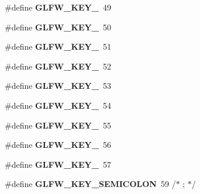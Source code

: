 \begin{DoxyCompactItemize}
\item 
\hypertarget{group__keys_ga05e4cae9ddb8d40cf6d82c8f11f2502f}{}\#define {\bfseries G\+L\+F\+W\+\_\+\+K\+E\+Y\+\_}~49\label{group__keys_ga05e4cae9ddb8d40cf6d82c8f11f2502f}

\item 
\hypertarget{group__keys_gadc8e66b3a4c4b5c39ad1305cf852863c}{}\#define {\bfseries G\+L\+F\+W\+\_\+\+K\+E\+Y\+\_}~50\label{group__keys_gadc8e66b3a4c4b5c39ad1305cf852863c}

\item 
\hypertarget{group__keys_ga812f0273fe1a981e1fa002ae73e92271}{}\#define {\bfseries G\+L\+F\+W\+\_\+\+K\+E\+Y\+\_}~51\label{group__keys_ga812f0273fe1a981e1fa002ae73e92271}

\item 
\hypertarget{group__keys_ga9e14b6975a9cc8f66cdd5cb3d3861356}{}\#define {\bfseries G\+L\+F\+W\+\_\+\+K\+E\+Y\+\_}~52\label{group__keys_ga9e14b6975a9cc8f66cdd5cb3d3861356}

\item 
\hypertarget{group__keys_ga4d74ddaa5d4c609993b4d4a15736c924}{}\#define {\bfseries G\+L\+F\+W\+\_\+\+K\+E\+Y\+\_}~53\label{group__keys_ga4d74ddaa5d4c609993b4d4a15736c924}

\item 
\hypertarget{group__keys_ga9ea4ab80c313a227b14d0a7c6f810b5d}{}\#define {\bfseries G\+L\+F\+W\+\_\+\+K\+E\+Y\+\_}~54\label{group__keys_ga9ea4ab80c313a227b14d0a7c6f810b5d}

\item 
\hypertarget{group__keys_gab79b1cfae7bd630cfc4604c1f263c666}{}\#define {\bfseries G\+L\+F\+W\+\_\+\+K\+E\+Y\+\_}~55\label{group__keys_gab79b1cfae7bd630cfc4604c1f263c666}

\item 
\hypertarget{group__keys_gadeaa109a0f9f5afc94fe4a108e686f6f}{}\#define {\bfseries G\+L\+F\+W\+\_\+\+K\+E\+Y\+\_}~56\label{group__keys_gadeaa109a0f9f5afc94fe4a108e686f6f}

\item 
\hypertarget{group__keys_ga2924cb5349ebbf97c8987f3521c44f39}{}\#define {\bfseries G\+L\+F\+W\+\_\+\+K\+E\+Y\+\_}~57\label{group__keys_ga2924cb5349ebbf97c8987f3521c44f39}

\item 
\hypertarget{group__keys_ga84233de9ee5bb3e8788a5aa07d80af7d}{}\#define {\bfseries G\+L\+F\+W\+\_\+\+K\+E\+Y\+\_\+\+S\+E\+M\+I\+C\+O\+L\+O\+N}~59  /$\ast$ ; $\ast$/\label{group__keys_ga84233de9ee5bb3e8788a5aa07d80af7d}


\end{DoxyCompactItemize}
